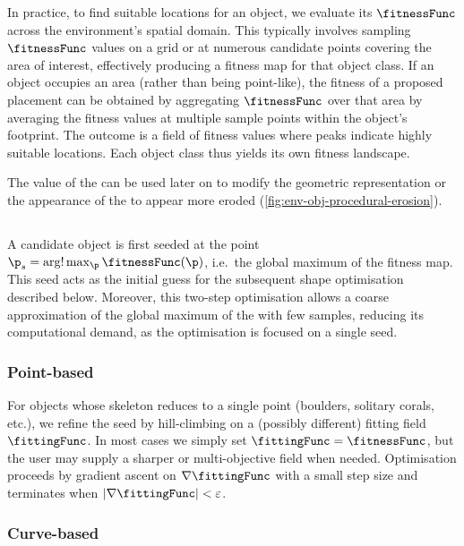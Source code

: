 In practice, to find suitable locations for an object, we evaluate its $\fitnessFunc$ across the environment's spatial domain. This typically involves sampling $\fitnessFunc$ values on a grid or at numerous candidate points covering the area of interest, effectively producing a fitness map for that object class. If an object occupies an area (rather than being point-like), the fitness of a proposed placement can be obtained by aggregating $\fitnessFunc$ over that area by averaging the fitness values at multiple sample points within the object's footprint. The outcome is a field of fitness values where peaks indicate highly suitable locations. Each object class thus yields its own fitness landscape.

The value of the  can be used later on to modify the geometric representation or the appearance of the  to appear more eroded (\cref{fig:env-obj-procedural-erosion}).

\subsection{}

A candidate object is first seeded at the point $\p_s=\arg!\max_\p \fitnessFunc(\p)$, i.e.\ the global maximum of the fitness map. This seed acts as the initial guess for the subsequent shape optimisation described below. Moreover, this two-step optimisation allows a coarse approximation of the global maximum of the  with few samples, reducing its computational demand, as the  optimisation is focused on a single seed.

\subsubsection{Point-based }

For objects whose skeleton reduces to a single point (boulders, solitary corals, etc.), we refine the seed by hill-climbing on a (possibly different) fitting field $\fittingFunc$. In most cases we simply set $\fittingFunc=\fitnessFunc$, but the user may supply a sharper or multi-objective field when needed. Optimisation proceeds by gradient ascent on $\nabla\fittingFunc$ with a small step size and terminates when $|\nabla \fittingFunc|<\varepsilon$.

\subsubsection{Curve-based }

